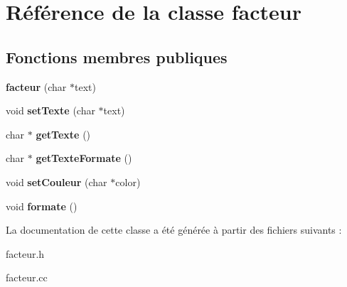 \hypertarget{classfacteur}{\section{\-Référence de la classe facteur}
\label{classfacteur}
}
\subsection*{\-Fonctions membres publiques}
\begin{DoxyCompactItemize}
\item 
\hypertarget{classfacteur_a37969c236190fe385b6663d343e7783b}{{\bfseries facteur} (char $\ast$text)}\label{classfacteur_a37969c236190fe385b6663d343e7783b}

\item 
\hypertarget{classfacteur_a52cafa1f466cb6df7224f5eca8f94c9f}{void {\bfseries set\-Texte} (char $\ast$text)}\label{classfacteur_a52cafa1f466cb6df7224f5eca8f94c9f}

\item 
\hypertarget{classfacteur_a2e7786ea2ac10cda35b19997bfb37903}{char $\ast$ {\bfseries get\-Texte} ()}\label{classfacteur_a2e7786ea2ac10cda35b19997bfb37903}

\item 
\hypertarget{classfacteur_a1c63b89f89e8424c04bc4baee18a3a81}{char $\ast$ {\bfseries get\-Texte\-Formate} ()}\label{classfacteur_a1c63b89f89e8424c04bc4baee18a3a81}

\item 
\hypertarget{classfacteur_adc6a02644be145298db1145c2be7b68b}{void {\bfseries set\-Couleur} (char $\ast$color)}\label{classfacteur_adc6a02644be145298db1145c2be7b68b}

\item 
\hypertarget{classfacteur_ad309a3512322274590b87777fafa2891}{void {\bfseries formate} ()}\label{classfacteur_ad309a3512322274590b87777fafa2891}

\end{DoxyCompactItemize}


\-La documentation de cette classe a été générée à partir des fichiers suivants \-:\begin{DoxyCompactItemize}
\item 
facteur.\-h\item 
facteur.\-cc\end{DoxyCompactItemize}

